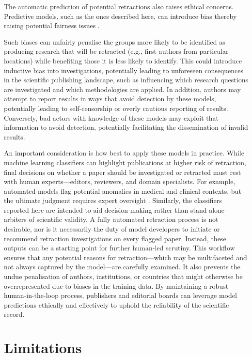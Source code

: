\documentclass[pdflatex,sn-mathphys-num]{sn-jnl}
\begin{document}
The automatic prediction of potential retractions also raises ethical concerns. Predictive models, such as the ones described here, can introduce bias thereby raising potential fairness issues \cite{caton2024fairness,mehrabi2021survey}.


Such biases can unfairly penalise the groups more likely to be identified as producing research that will be retracted (e.g., first authors from particular locations) while benefiting those it is less likely to identify. This could introduce inductive bias into investigations, potentially leading to unforeseen consequences in the scientific publishing landscape, such as influencing which research questions are investigated and which methodologies are applied. In addition, authors may attempt to report results in ways that avoid detection by these models, potentially leading to self-censorship or overly cautious reporting of results. Conversely, bad actors with knowledge of these models may exploit that information to avoid detection, potentially facilitating the dissemination of invalid results.

An important consideration is how best to apply these models in practice. While machine learning classifiers can highlight publications at higher risk of retraction, final decisions on whether a paper should be investigated or retracted must rest with human experts—editors, reviewers, and domain specialists. For example, automated models flag potential anomalies in medical and clinical contexts, but the ultimate judgment requires expert oversight \cite{prictor_where_2023, funer_responsibility_2023}. Similarly, the classifiers reported here are intended to aid decision-making rather than stand-alone arbiters of scientific validity. A fully automated retraction process is not desirable, nor is it necessarily the duty of model developers to initiate or recommend retraction investigations on every flagged paper. Instead, these outputs can be a starting point for further human-led scrutiny. This workflow ensures that any potential reasons for retraction—which may be multifaceted and not always captured by the model—are carefully examined. It also prevents the undue penalisation of authors, institutions, or countries that might otherwise be overrepresented due to biases in the training data. By maintaining a robust human-in-the-loop process, publishers and editorial boards can leverage model predictions ethically and effectively to uphold the reliability of the scientific record.


\section{Limitations}
\end{document}
